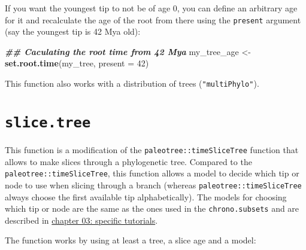\documentclass[
]{book}
\newenvironment{Shaded}{\begin{snugshade}}{\end{snugshade}}
\newcommand{\AttributeTok}[1]{\textcolor[rgb]{0.13,0.29,0.53}{#1}}
\newcommand{\DecValTok}[1]{\textcolor[rgb]{0.00,0.00,0.81}{#1}}
\newcommand{\DocumentationTok}[1]{\textcolor[rgb]{0.56,0.35,0.01}{\textbf{\textit{#1}}}}
\newcommand{\FunctionTok}[1]{\textcolor[rgb]{0.13,0.29,0.53}{\textbf{#1}}}
\newcommand{\NormalTok}[1]{#1}
\newcommand{\OtherTok}[1]{\textcolor[rgb]{0.56,0.35,0.01}{#1}}
\begin{document}
If you want the youngest tip to not be of age 0, you can define an arbitrary age for it and recalculate the age of the root from there using the \texttt{present} argument (say the youngest tip is 42 Mya old):

\begin{Shaded}
\begin{Highlighting}[]
\DocumentationTok{\#\# Caculating the root time from 42 Mya }
\NormalTok{my\_tree\_age }\OtherTok{\textless{}{-}} \FunctionTok{set.root.time}\NormalTok{(my\_tree, }\AttributeTok{present =} \DecValTok{42}\NormalTok{)}
\end{Highlighting}
\end{Shaded}

This function also works with a distribution of trees (\texttt{"multiPhylo"}).

\hypertarget{slice.tree}{%
\section{\texorpdfstring{\texttt{slice.tree}}{slice.tree}}\label{slice.tree}}

This function is a modification of the \texttt{paleotree::timeSliceTree} function that allows to make slices through a phylogenetic tree.
Compared to the \texttt{paleotree::timeSliceTree}, this function allows a model to decide which tip or node to use when slicing through a branch (whereas \texttt{paleotree::timeSliceTree} always choose the first available tip alphabetically).
The models for choosing which tip or node are the same as the ones used in the \texttt{chrono.subsets} and are described in \protect\hyperlink{chrono-subsets}{chapter 03: specific tutorials}.

The function works by using at least a tree, a slice age and a model:
\end{document}
